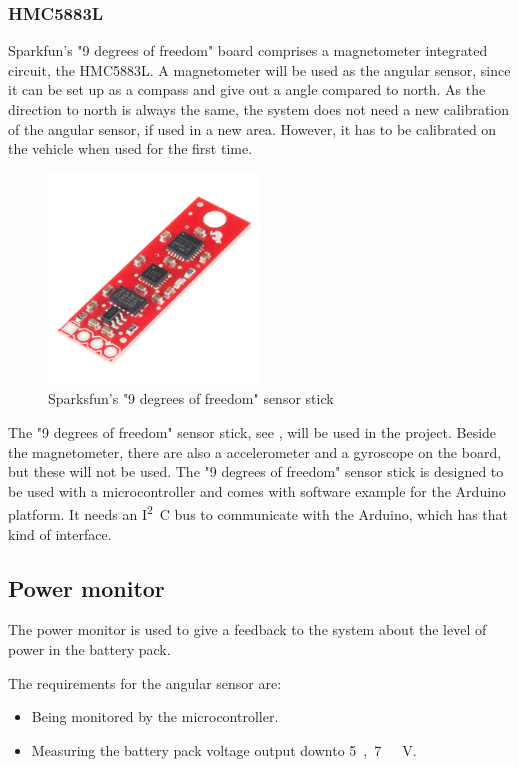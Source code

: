 \subsubsection{HMC5883L}
Sparkfun's "9 degrees of freedom" board comprises a magnetometer integrated circuit, the HMC5883L\cite{HMC5883L}. A magnetometer will be used as the angular sensor, since it can be set up as a compass and give out a angle compared to north. As the direction to north is always the same, the system does not need a new calibration of the angular sensor, if used in a new area. However, it has to be calibrated on the vehicle when used for the first time.

\begin{figure}[H]
	\centering
	\includegraphics[width=0.50\textwidth]{figures/NineDegree.jpg}
		\caption{Sparksfun's "9 degrees of freedom" sensor stick} 
	\label{NineDegree}
\end{figure}

The "9 degrees of freedom" sensor stick, see , will be used in the project. Beside the magnetometer, there are also a accelerometer and a gyroscope on the board, but these will not be used. The "9 degrees of freedom" sensor stick is designed to be used with a microcontroller and comes with software example for the Arduino platform. It needs an  \si{I^2C} bus to communicate with the Arduino, which has that kind of interface.


\subsection{Power monitor}
The power monitor is used to give a feedback to the system about the level of power in the battery pack.

The requirements for the angular sensor are:
\begin{itemize}
\item Being monitored by the microcontroller.
\item Measuring the battery pack voltage output downto \si{5,7\ V}.
\end{itemize}

